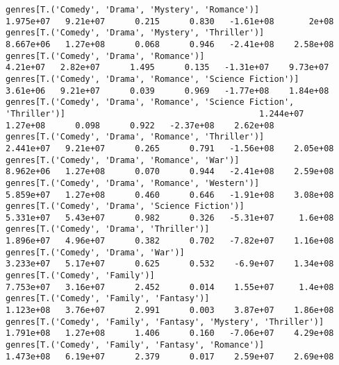 \documentclass[11pt]{article}
\begin{document}
\begin{Verbatim}[commandchars=\\\{\}]
genres[T.('Comedy', 'Drama', 'Mystery', 'Romance')]                                                           1.975e+07   9.21e+07      0.215      0.830   -1.61e+08       2e+08
genres[T.('Comedy', 'Drama', 'Mystery', 'Thriller')]                                                          8.667e+06   1.27e+08      0.068      0.946   -2.41e+08    2.58e+08
genres[T.('Comedy', 'Drama', 'Romance')]                                                                       4.21e+07   2.82e+07      1.495      0.135   -1.31e+07    9.73e+07
genres[T.('Comedy', 'Drama', 'Romance', 'Science Fiction')]                                                    3.61e+06   9.21e+07      0.039      0.969   -1.77e+08    1.84e+08
genres[T.('Comedy', 'Drama', 'Romance', 'Science Fiction', 'Thriller')]                                       1.244e+07   1.27e+08      0.098      0.922   -2.37e+08    2.62e+08
genres[T.('Comedy', 'Drama', 'Romance', 'Thriller')]                                                          2.441e+07   9.21e+07      0.265      0.791   -1.56e+08    2.05e+08
genres[T.('Comedy', 'Drama', 'Romance', 'War')]                                                               8.962e+06   1.27e+08      0.070      0.944   -2.41e+08    2.59e+08
genres[T.('Comedy', 'Drama', 'Romance', 'Western')]                                                           5.859e+07   1.27e+08      0.460      0.646   -1.91e+08    3.08e+08
genres[T.('Comedy', 'Drama', 'Science Fiction')]                                                              5.331e+07   5.43e+07      0.982      0.326   -5.31e+07     1.6e+08
genres[T.('Comedy', 'Drama', 'Thriller')]                                                                     1.896e+07   4.96e+07      0.382      0.702   -7.82e+07    1.16e+08
genres[T.('Comedy', 'Drama', 'War')]                                                                          3.233e+07   5.17e+07      0.625      0.532    -6.9e+07    1.34e+08
genres[T.('Comedy', 'Family')]                                                                                7.753e+07   3.16e+07      2.452      0.014    1.55e+07     1.4e+08
genres[T.('Comedy', 'Family', 'Fantasy')]                                                                     1.123e+08   3.76e+07      2.991      0.003    3.87e+07    1.86e+08
genres[T.('Comedy', 'Family', 'Fantasy', 'Mystery', 'Thriller')]                                              1.791e+08   1.27e+08      1.406      0.160   -7.06e+07    4.29e+08
genres[T.('Comedy', 'Family', 'Fantasy', 'Romance')]                                                          1.473e+08   6.19e+07      2.379      0.017    2.59e+07    2.69e+08

\end{Verbatim}
\end{document}
